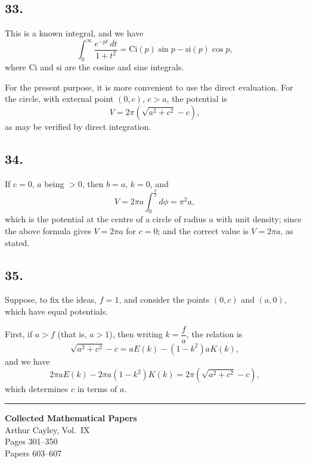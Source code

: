 \documentclass[11pt,a4paper]{book}
\begin{document}
\subsection*{33.}

This is a known integral, and we have
\[
\int_0^{\infty} \frac{e^{-pt}\,dt}{1+t^2}
  = \mathrm{Ci}(p)\sin p - \mathrm{si}(p)\cos p,
\]
where $\mathrm{Ci}$ and $\mathrm{si}$ are the cosine and sine integrals.

For the present purpose, it is more convenient to use the direct evaluation.
For the circle, with external point $(0,c)$, $c>a$, the potential is
\[
V = 2\pi\left(\sqrt{a^2+c^2}-c\right),
\]
as may be verified by direct integration.

\newpage
\subsection*{34.}

If $c=0$, $a$ being $>0$, then $b=a$, $k=0$, and
\[
V = 2\pi a \int_0^{\frac{\pi}{2}} d\phi = \pi^2 a,
\]
which is the potential at the centre of a circle of radius $a$ with unit
density; since the above formula gives $V=2\pi a$ for $c=0$; and the correct
value is $V=2\pi a$, as stated.

\subsection*{35.}

Suppose, to fix the ideas, $f=1$, and consider the points $(0,c)$ and
$(a,0)$, which have equal potentials.

First, if $a>f$ (that is, $a>1$), then writing $k=\dfrac{f}{a}$, the
relation is
\[
\sqrt{a^2+c^2}-c = aE(k) - (1-k^2)aK(k),
\]
and we have
\[
2\pi a E(k) - 2\pi a(1-k^2)K(k) = 2\pi(\sqrt{a^2+c^2}-c),
\]
which determines $c$ in terms of $a$.

\vspace{2em}
\begin{center}
\rule{0.8\textwidth}{0.4pt}
\end{center}
\clearpage


\begin{center}
{\LARGE\bfseries Collected Mathematical Papers\\[0.5em]}
{\Large Arthur Cayley, Vol.~IX\\[1em]}
{\large Pages 301--350\\[0.5em]}
{\normalsize Papers 603--607}
\end{center}
\end{document}
